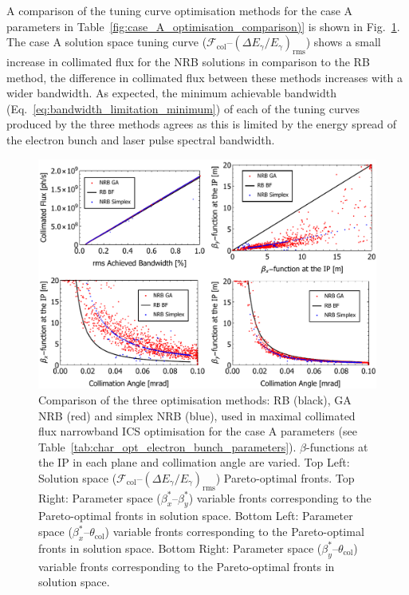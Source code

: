 \documentclass[../main.tex]{subfiles}
\begin{document}
A comparison of the tuning curve optimisation methods for the case A parameters in Table~\ref{fig:case_A_optimisation_comparison)} is shown in Fig.~\ref{fig:case_A_optimisation_comparison}. The case A solution space tuning curve ($\mathcal{F}_{\mathrm{col}}$--$\left(\Delta E_{\gamma}/E_{\gamma}\right)_{\mathrm{rms}}$) shows a small increase in collimated flux for the NRB solutions in comparison to the RB method, the difference in collimated flux between these methods increases with a wider bandwidth. As expected, the minimum achievable bandwidth (Eq.~\ref{eq:bandwidth_limitation_minimum}) of each of the tuning curves produced by the three methods agrees as this is limited by the energy spread of the electron bunch and laser pulse spectral bandwidth.

\begin{figure}[!h]
\centering
\includegraphics[width=\textwidth]{Figures/Optimisation_and_Characterisation_of_Inverse_Compton_Scattering_Sources/CaseAoptcomp.pdf}
\caption{Comparison of the three optimisation methods: RB (black), GA NRB (red) and simplex NRB (blue), used in maximal collimated flux narrowband ICS optimisation for the case A parameters (see Table~\ref{tab:char_opt_electron_bunch_parameters}). $\beta$-functions at the IP in each plane and collimation angle are varied. Top Left: Solution space ($\mathcal{F}_{\mathrm{col}}$--$\left(\Delta E_{\gamma}/E_{\gamma}\right)_{\mathrm{rms}}$) Pareto-optimal fronts. Top Right: Parameter space ($\beta_{x}^{*}$--$\beta_{y}^{*}$) variable fronts corresponding to the Pareto-optimal fronts in solution space. Bottom Left: Parameter space ($\beta_{x}^{*}$--$\theta_{\mathrm{col}}$) variable fronts corresponding to the Pareto-optimal fronts in solution space. Bottom Right: Parameter space ($\beta_{y}^{*}$--$\theta_{\mathrm{col}}$) variable fronts corresponding to the Pareto-optimal fronts in solution space.}
\label{fig:case_A_optimisation_comparison}
\end{figure}
\end{document}
